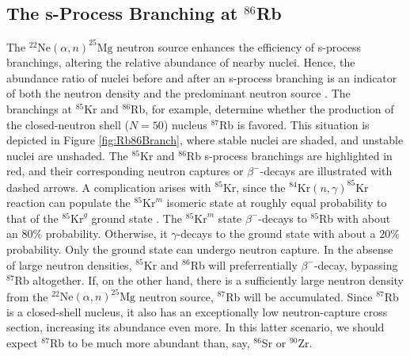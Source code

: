 \subsection{The s-Process Branching at $^{86}$Rb} \label{subsec:86Rb_Branch}

The $^{22}\mathrm{Ne}(\alpha,n)^{25}\mathrm{Mg}$ neutron source enhances the efficiency of s-process branchings, altering the relative abundance of nearby nuclei. Hence, the abundance ratio of nuclei before and after an s-process branching is an indicator of both the neutron density and the predominant neutron source \cite{Garcia2006}. The branchings at $^{85}$Kr and $^{86}$Rb, for example, determine whether the production of the closed-neutron shell ($N=50$) nucleus $^{87}$Rb is favored. This situation is depicted in Figure \ref{fig:Rb86Branch}, where stable nuclei are shaded, and unstable nuclei are unshaded. The $^{85}$Kr and $^{86}$Rb s-process branchings are highlighted in red, and their corresponding neutron captures or $\beta^{-}$-decays are illustrated with dashed arrows. A complication arises with $^{85}$Kr, since the $^{84}\mathrm{Kr}(n,\gamma)^{85}\mathrm{Kr}$ reaction can populate the $^{85}\mathrm{Kr}^{m}$ isomeric state at roughly equal probability to that of the $^{85}\mathrm{Kr}^{g}$ ground state \cite{Raut2013}. The $^{85}\mathrm{Kr}^{m}$ state $\beta^{-}$-decays to $^{85}$Rb with about an $80\%$ probability. Otherwise, it $\gamma$-decays to the ground state with about a $20\%$ probability. Only the ground state can undergo neutron capture. In the absense of large neutron densities, $^{85}$Kr and $^{86}$Rb will preferrentially $\beta^{-}$-decay, bypassing $^{87}$Rb altogether. If, on the other hand, there is a sufficiently large neutron density from the $^{22}\mathrm{Ne}(\alpha,n)^{25}\mathrm{Mg}$ neutron source, $^{87}$Rb will be accumulated. Since $^{87}$Rb is a closed-shell nucleus, it also has an exceptionally low neutron-capture cross section, increasing its abundance even more. In this latter scenario, we should expect $^{87}$Rb to be much more abundant than, say, $^{86}$Sr or $^{90}$Zr.

\def\BoxSpace{0.3} %
\def\BoxSpacetwo{\BoxSpace * 2} %
\def\BoxSpacethree{\BoxSpace * 3}
\def\BoxSpacefour{\BoxSpace * 4}
\def\BoxSpacehalf{\BoxSpace * 0.5}
\def\AOS{0.1} %
\def\AW{0.52} %

